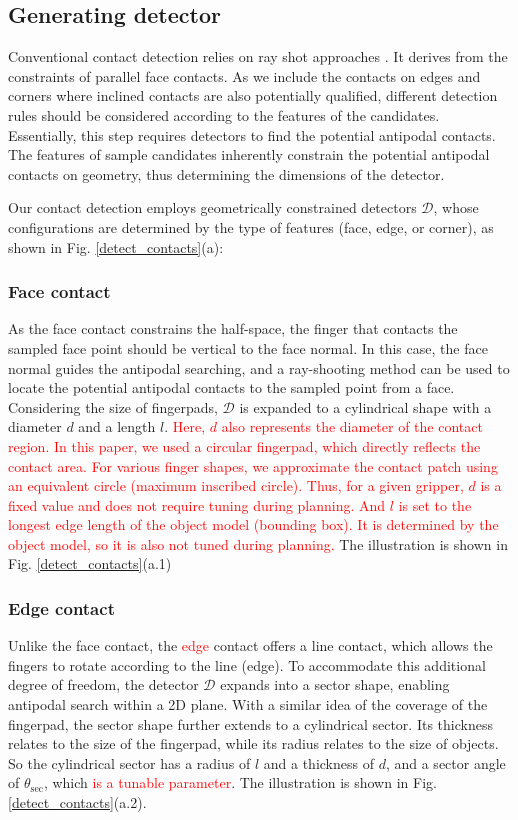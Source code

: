 \documentclass[journal]{IEEEtran}
\newcommand{\rev}[1]{\textcolor{red}{#1}}
\begin{document}
\subsection{Generating detector}
Conventional contact detection relies on ray shot approaches \cite{wan2020planning}. It derives from the constraints of parallel face contacts. As we include the contacts on edges and corners where inclined contacts are also potentially qualified, different detection rules should be considered according to the features of the candidates. 
Essentially, this step requires detectors to find the potential antipodal contacts. 
The features of sample candidates inherently constrain the potential antipodal contacts on geometry, thus determining the dimensions of the detector. 

Our contact detection employs geometrically constrained detectors \( \mathcal{D} \), whose configurations are determined by the type of features (face, edge, or corner), as shown in Fig. \ref{detect_contacts}(a):
\subsubsection{Face contact}
As the face contact constrains the half-space, the finger that contacts the sampled face point should be vertical to the face normal. In this case, the face normal guides the antipodal searching, and a ray-shooting method can be used to locate the potential antipodal contacts to the sampled point from a face. Considering the size of fingerpads, $\mathcal{D}$ is expanded to a cylindrical shape with a diameter $d$ and a length $l$. 
\rev{Here, $d$ also represents the diameter of the contact region. In this paper, we used a circular fingerpad, which directly reflects the contact area. For various finger shapes, we approximate the contact patch using an equivalent circle (maximum inscribed circle). Thus, for a given gripper, $d$ is a fixed value and does not require tuning during planning. And $l$ is set to the longest edge length of the object model (bounding box). It is determined by the object model, so it is also not tuned during planning.} The illustration is shown in Fig. \ref{detect_contacts}(a.1)

\subsubsection{Edge contact}
Unlike the face contact, the \rev{edge} contact offers a line contact, which allows the fingers to rotate according to the line (edge). To accommodate this additional degree of freedom, the detector \( \mathcal{D} \) expands into a sector shape, enabling antipodal search within a 2D plane. With a similar idea of the coverage of the fingerpad, the sector shape further extends to a cylindrical sector. Its thickness relates to the size of the fingerpad, while its radius relates to the size of objects. So the cylindrical sector has a radius of $l$ and a thickness of $d$, and a sector angle of $\theta_\mathrm{sec}$, which \rev{is a tunable parameter}. The illustration is shown in Fig. \ref{detect_contacts}(a.2).
\end{document}
